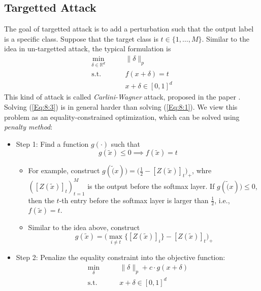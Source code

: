 \subsection{Targetted Attack}
The goal of targetted attack is to add a perturbation such that the output label is a specific class.
Suppose that the target class is $t\in\{1,\dots,M\}$. Similar to the idea in un-targetted attack, the typical formulation is 
\begin{subequations}\label{Eq:8:3}
\begin{align}
\min_{\delta\in\mathbb{R}^d}\qquad&\|\delta\|_p\label{Eq:8:3:a}\\
\text{s.t.}\qquad&f(x+\delta)=t\label{Eq:8:3:b}\\
&x+\delta \in[0,1]^d\label{Eq:8:3:c}
\end{align}
\end{subequations}
This kind of attack is called \emph{Carlini-Wagner} attack, proposed in the paper \citep{7958570}.
Solving (\ref{Eq:8:3}) is in general harder than solving (\ref{Eq:8:1}).
We view this problem as an equality-constrained optimization, which can be solved using \emph{penalty method}:
\begin{itemize}
\item
Step 1: Find a function $g(\cdot)$ such that 
\[
g(\tilde{x})\le0\implies f(\tilde{x})=t
\]
\begin{itemize}
\item
For example, construct $g(\tilde(x)) = \bigg(\frac{1}{2} - [Z(\tilde{x})]_t\bigg)_+$, whre $([Z(\tilde{x})]_{t})_{t=1}^M$ is the output before the softmax layer.
If $g(\tilde(x))\le0$, then the $t$-th entry before the softmax layer is larger than $\frac{1}{2}$, i.e., $f(\tilde{x})=t$.
\item
Similar to the idea above, construct
\[
g(\tilde{x})=\bigg(\max_{i\ne t}\{[Z(\tilde{x})]_i\} - [Z(\tilde{x})]_t\bigg)_+
\]

\end{itemize}
\item
Step 2: Penalize the equality constraint into the objective function:
\begin{subequations}\label{Eq:8:4}
\begin{align}
\min_{\delta}\qquad&\|\delta\|_p + c\cdot g(x+\delta)\\
\text{s.t.}\qquad&x+\delta \in[0,1]^d
\end{align}
\end{subequations}
\end{itemize}


